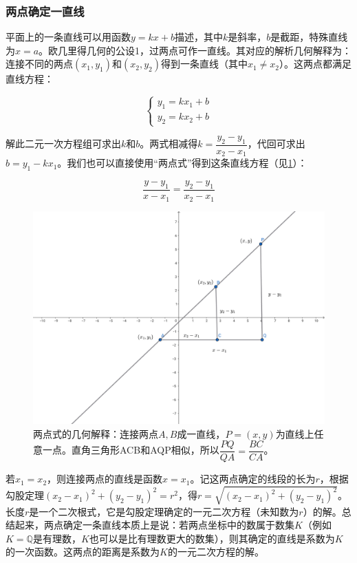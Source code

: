 \documentclass[b5paper]{ctexart}
\begin{document}
\subsubsection{两点确定一直线}
平面上的一条直线可以用函数$y = kx + b$描述，其中$k$是斜率，$b$是截距，特殊直线为$x = a$。欧几里得几何的公设1，过两点可作一直线。其对应的解析几何解释为：连接不同的两点$(x_1, y_1)$和$(x_2, y_2)$得到一条直线（其中$x_1 \ne x_2$）。这两点都满足直线方程：

\[
\begin{cases}
y_1 = k x_1 + b \\
y_2 = k x_2 + b
\end{cases}
\]

解此二元一次方程组可求出$k$和$b$。两式相减得$k = \dfrac{y_2 - y_1}{x_2 - x_1}$，代回可求出$b = y_1 - k x_1$。我们也可以直接使用“两点式”得到这条直线方程（见\cref{fig:line2p}）：

\[
\frac{y - y_1}{x - x_1} = \frac{y_2 - y_1}{x_2 - x_1}
\]

\begin{figure}[htbp]
 \centering
 \includegraphics[scale=0.35]{img/line2p}
 \caption{两点式的几何解释：连接两点$A, B$成一直线，$P = (x, y)$为直线上任意一点。直角三角形ACB和AQP相似，所以$\dfrac{PQ}{QA} = \dfrac{BC}{CA}$。}
 \label{fig:line2p}
\end{figure}

若$x_1 = x_2$，则连接两点的直线是函数$x = x_1$。记这两点确定的线段的长为$r$，根据勾股定理$(x_2 - x_1)^2 + (y_2 - y_1)^2 = r^2$，得$r = \sqrt{(x_2 - x_1)^2 + (y_2 - y_1)^2}$。长度$r$是一个二次根式，它是勾股定理确定的一元二次方程（未知数为$r$）的解。总结起来，两点确定一条直线本质上是说：若两点坐标中的数属于数集$K$（例如$K = \mathbb{Q}$是有理数，$K$也可以是比有理数更大的数集），则其确定的直线是系数为$K$的一次函数。这两点的距离是系数为$K$的一元二次方程的解。
\end{document}
